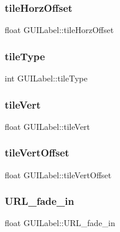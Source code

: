 \subsubsection{\texorpdfstring{tile\+Horz\+Offset}{tileHorzOffset}}
{\footnotesize\ttfamily float G\+U\+I\+Label\+::tile\+Horz\+Offset}

\hypertarget{class_g_u_i_label_a953d84b5fc97168638b2272b258c5070}{}\label{class_g_u_i_label_a953d84b5fc97168638b2272b258c5070} 
\subsubsection{\texorpdfstring{tile\+Type}{tileType}}
{\footnotesize\ttfamily int G\+U\+I\+Label\+::tile\+Type}

\hypertarget{class_g_u_i_label_aecb91fd9aa8748bfa71d168efd81960c}{}\label{class_g_u_i_label_aecb91fd9aa8748bfa71d168efd81960c} 
\subsubsection{\texorpdfstring{tile\+Vert}{tileVert}}
{\footnotesize\ttfamily float G\+U\+I\+Label\+::tile\+Vert}

\hypertarget{class_g_u_i_label_ab63b45e062812ca5aa7a77406b8599b2}{}\label{class_g_u_i_label_ab63b45e062812ca5aa7a77406b8599b2} 
\subsubsection{\texorpdfstring{tile\+Vert\+Offset}{tileVertOffset}}
{\footnotesize\ttfamily float G\+U\+I\+Label\+::tile\+Vert\+Offset}

\hypertarget{class_g_u_i_label_a7e65c2f0b7294842caea411578422fd2}{}\label{class_g_u_i_label_a7e65c2f0b7294842caea411578422fd2} 
\subsubsection{\texorpdfstring{U\+R\+L\+\_\+fade\+\_\+in}{URL\_fade\_in}}
{\footnotesize\ttfamily float G\+U\+I\+Label\+::\+U\+R\+L\+\_\+fade\+\_\+in}

